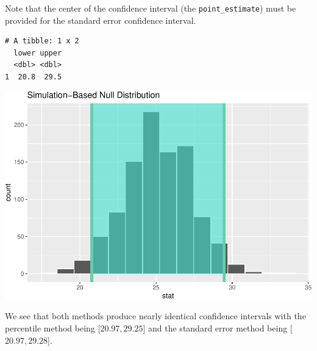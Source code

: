 \documentclass[]{article}
\newenvironment{Shaded}{\begin{snugshade}}{\end{snugshade}}
\newcommand{\KeywordTok}[1]{\textcolor[rgb]{0.13,0.29,0.53}{\textbf{#1}}}
\newcommand{\DataTypeTok}[1]{\textcolor[rgb]{0.13,0.29,0.53}{#1}}
\newcommand{\StringTok}[1]{\textcolor[rgb]{0.31,0.60,0.02}{#1}}
\newcommand{\OperatorTok}[1]{\textcolor[rgb]{0.81,0.36,0.00}{\textbf{#1}}}
\newcommand{\NormalTok}[1]{#1}
\begin{document}
Note that the center of the confidence interval (the
\texttt{point\_estimate}) must be provided for the standard error
confidence interval.

\begin{Shaded}
\end{Shaded}

\begin{verbatim}
# A tibble: 1 x 2
  lower upper
  <dbl> <dbl>
1  20.8  29.5
\end{verbatim}

\begin{Shaded}
\end{Shaded}

\includegraphics{DAWeek7_files/figure-latex/get_ci3-1.pdf}

We see that both methods produce nearly identical confidence intervals
with the percentile method being {[}\(20.97,29.25\){]} and the standard
error method being {[}\(20.97,29.28\){]}.
\end{document}
